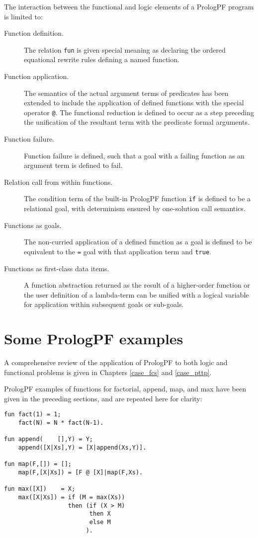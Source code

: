 The interaction between the functional and logic elements of a PrologPF
program is limited to:
\begin{description}
\item[Function definition.]{The relation \texttt{fun} is given special meaning as
  declaring the ordered equational rewrite rules defining a named function.}
\item[Function application.]{The semantics of the actual argument
  terms of predicates has been extended to
  include the application of defined functions
  with the special operator \texttt{@}.  The functional reduction
  is defined to occur as a step preceding the unification of the resultant term
  with the predicate formal arguments.}
\item[Function failure.]{Function failure is defined, such that a goal with a failing
  function as an argument term is defined to fail.}
\item[Relation call from within functions.]{The condition term of the built-in
  PrologPF function \texttt{if} is defined to be a relational goal, with determinism
  ensured by one-solution call semantics.}
\item[Functions as goals.]{The non-curried application of a defined function as a goal is
  defined to be equivalent to the \texttt{=} goal with that application term and
  \texttt{true}.}
\item[Functions as first-class data items.]{A function abstraction returned as the
  result of a higher-order function or the user definition of a lambda-term can be
  unified with a logical variable for application within subsequent goals or sub-goals.}
\end{description}

\section{Some PrologPF examples} %

A comprehensive review of the application of PrologPF to both logic and functional
problems is given in Chapters \ref{case_fcs} and \ref{case_pttp}.

PrologPF examples of functions for factorial, append, map, and max 
have been given in
the preceding sections, and are repeated here for clarity:
\begin{verbatim}
fun fact(1) = 1;
    fact(N) = N * fact(N-1).

fun append(    [],Y) = Y;
    append([X|Xs],Y) = [X|append(Xs,Y)].

fun map(F,[]) = [];
    map(F,[X|Xs]) = [F @ [X]|map(F,Xs).

fun max([X])    = X;
    max([X|Xs]) = if (M = max(Xs))
                  then (if (X > M)
                        then X
                        else M
                       ).
\end{verbatim}

